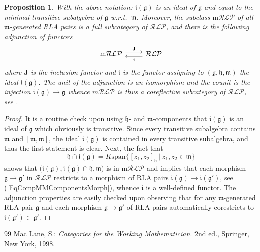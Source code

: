 \documentclass[10pt,a4paper]{amsart}
\newtheorem{proposition}{Proposition}
\begin{document}
\begin{proposition} With the above notation: $\mathfrak{i}(\mathfrak{g})$ is an
	ideal of $\mathfrak{g}$ and equal to the minimal transitive subalgebra of 
	$\mathfrak{g}$ w.r.t.~$\mathfrak{m}$. Moreover,
  the subclass $\mathrm{m}\mathcal{RLP}$ of all \textit{$\mathfrak{m}$-generated}
  RLA pairs is a full subcategory of $\mathcal{RLP}$, and there is the following
  adjunction of functors
  \begin{equation}
  	\begin{tikzcd}
  		 \mathrm{m}\mathcal{RLP}
  		\arrow[r, yshift=0.7ex, "\mathbf{J}"]
  		&\mathcal{RLP}\arrow[l, yshift=-0.7ex, 
  		"\boldsymbol{\mathfrak{i}}"]
  	\end{tikzcd}
  \end{equation}
  where $\mathbf{J}$ is the inclusion functor and $\boldsymbol{\mathfrak{i}}$
  is the functor assigning to $(\mathfrak{g},\mathfrak{h},\mathfrak{m})$
  the ideal $\mathfrak{i}(\mathfrak{g})$. The unit of the adjunction is an isomorphism and the counit is the injection
  $\mathfrak{i}(\mathfrak{g})\to \mathfrak{g}$ whence $m\mathcal{RLP}$ is thus a coreflective subcategory of $\mathcal{RLP}$, see \cite[p.~91]{Mac98}.
\end{proposition}

\begin{proof}
It is a routine check upon using $\mathfrak{h}$- and $\mathfrak{m}$-components
that $\mathfrak{i}(\mathfrak{g})$ is an ideal of $\mathfrak{g}$ which obviously is
transitive. Since every transitive subalgebra contains $\mathfrak{m}$ and 
$[\mathfrak{m},\mathfrak{m}]$, the ideal $\mathfrak{i}(\mathfrak{g})$ is contained in
every transitive subalgebra, and thus the first statement is clear. Next,
the fact that
\begin{equation}\label{EqCompHCompOfLieIdealI}
	\mathfrak{h}\cap \mathfrak{i}(\mathfrak{g})
	=K\mathrm{span}\big\{[z_1,z_2]_\mathfrak{h}
	~\big|~z_1,z_2\in\mathfrak{m}\big\}
\end{equation}
shows that $\big(\mathfrak{i}(\mathfrak{g}),\mathfrak{i}(\mathfrak{g})\cap \mathfrak{h},\mathfrak{m}\big)$ is in $\mathrm{m}\mathcal{RLP}$ and
implies that each morphism $\mathfrak{g}\to\mathfrak{g}'$ in $\mathcal{RLP}$ restricts to a morphism of RLA pairs $\mathfrak{i}(\mathfrak{g})\to
\mathfrak{i}(\mathfrak{g}')$, see (\ref{EqCompMMComponentsMorph}), whence
$\boldsymbol{\mathfrak{i}}$ is a well-defined functor. The adjunction properties are easily checked upon observing that for any
$\mathfrak{m}$-generated RLA pair $\mathfrak{g}$ and each morphism
$\mathfrak{g}\to\mathfrak{g}'$ of RLA pairs automatically corestricts to
$\mathfrak{i}(\mathfrak{g}')\subset \mathfrak{g}'$. 
\end{proof}

\begin{thebibliography}{99}
 Mac Lane, S.: \textit{Categories for the Working Mathematician}. 2nd ed., Springer, New York, 1998.
\end{thebibliography}
\end{document}

